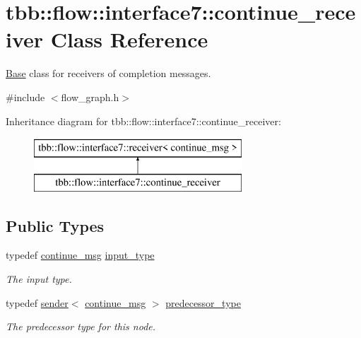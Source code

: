 \hypertarget{classtbb_1_1flow_1_1interface7_1_1continue__receiver}{}\section{tbb\+:\+:flow\+:\+:interface7\+:\+:continue\+\_\+receiver Class Reference}
\label{classtbb_1_1flow_1_1interface7_1_1continue__receiver}


\hyperlink{structBase}{Base} class for receivers of completion messages.  




{\ttfamily \#include $<$flow\+\_\+graph.\+h$>$}

Inheritance diagram for tbb\+:\+:flow\+:\+:interface7\+:\+:continue\+\_\+receiver\+:\begin{figure}[H]
\begin{center}
\leavevmode
\includegraphics[height=2.000000cm]{classtbb_1_1flow_1_1interface7_1_1continue__receiver}
\end{center}
\end{figure}
\subsection*{Public Types}
\begin{DoxyCompactItemize}
\item 
\hypertarget{classtbb_1_1flow_1_1interface7_1_1continue__receiver_a7474ed0edad2bb26d9f86065ecf2c93d}{}typedef \hyperlink{classtbb_1_1flow_1_1interface7_1_1continue__msg}{continue\+\_\+msg} \hyperlink{classtbb_1_1flow_1_1interface7_1_1continue__receiver_a7474ed0edad2bb26d9f86065ecf2c93d}{input\+\_\+type}\label{classtbb_1_1flow_1_1interface7_1_1continue__receiver_a7474ed0edad2bb26d9f86065ecf2c93d}

\begin{DoxyCompactList}\small\item\em The input type. \end{DoxyCompactList}\item 
\hypertarget{classtbb_1_1flow_1_1interface7_1_1continue__receiver_a86d210b5614d47aaa43731b7e303751f}{}typedef \hyperlink{classtbb_1_1flow_1_1interface7_1_1sender}{sender}$<$ \hyperlink{classtbb_1_1flow_1_1interface7_1_1continue__msg}{continue\+\_\+msg} $>$ \hyperlink{classtbb_1_1flow_1_1interface7_1_1continue__receiver_a86d210b5614d47aaa43731b7e303751f}{predecessor\+\_\+type}\label{classtbb_1_1flow_1_1interface7_1_1continue__receiver_a86d210b5614d47aaa43731b7e303751f}

\begin{DoxyCompactList}\small\item\em The predecessor type for this node. \end{DoxyCompactList}\end{DoxyCompactItemize}
